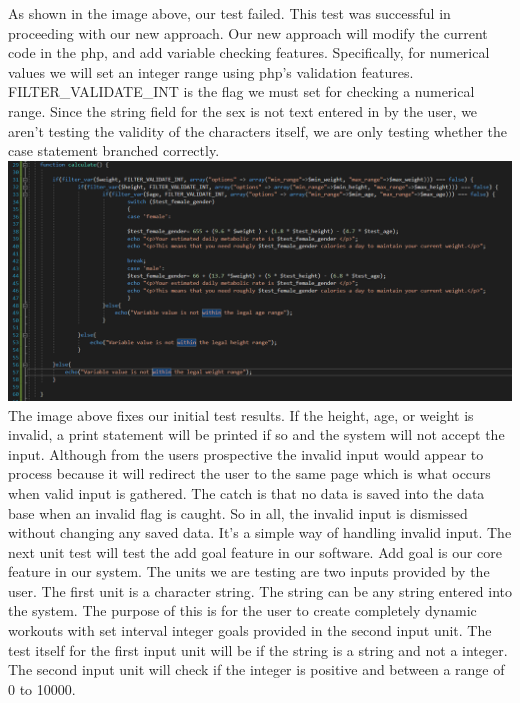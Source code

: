 \documentclass[a4paper]{article}
\begin{document}
\newline
\newline
As shown in the image above, our test failed. This test was successful in proceeding with our new approach. Our new approach will modify the current code in the php, and add variable checking features. Specifically, for numerical values we will set an integer range using php's validation features. FILTER\_VALIDATE\_INT is the flag we must set for checking a numerical range. Since the string field for the sex is not text entered in by the user, we aren't testing the validity of the characters itself, we are only testing whether the case statement branched correctly.
\newline
\newline
\includegraphics[width=\textwidth]{test7.PNG}
\newline
\newline
The image above fixes our initial test results. If the height, age, or weight is invalid, a print statement will be printed if so and the system will not accept the input. Although from the users prospective the invalid input would appear to process because it will redirect the user to the same page which is what occurs when valid input is gathered. The catch is that no data is saved into the data base when an invalid flag is caught. So in all, the invalid input is dismissed without changing any saved data. It's a simple way of handling invalid input. 
\newline
\newline
The next unit test will test the add goal feature in our software. Add goal is our core feature in our system. The units we are testing are two inputs provided by the user. The first unit is a character string. The string can be any string entered into the system. The purpose of this is for the user to create completely dynamic workouts with set interval integer goals provided in the second input unit. The test itself for the first input unit will be if the string is a string and not a integer. The second input unit will check if the integer is positive and between a range of 0 to 10000. 
\end{document}
